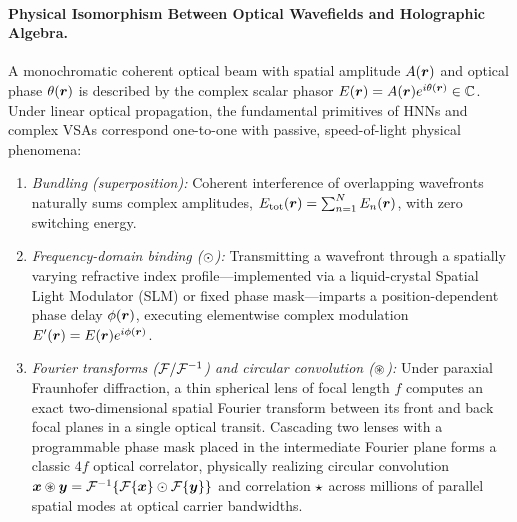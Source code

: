 \paragraph{Physical Isomorphism Between Optical Wavefields and Holographic Algebra.}
A monochromatic coherent optical beam with spatial amplitude $A(\boldsymbol{r})$ and optical phase $\theta(\boldsymbol{r})$ is described by the complex scalar phasor $E(\boldsymbol{r}) = A(\boldsymbol{r}) e^{i\theta(\boldsymbol{r})} \in \mathbb{C}$.
Under linear optical propagation, the fundamental primitives of HNNs and complex VSAs correspond one-to-one with passive, speed-of-light physical phenomena:
\begin{enumerate}
    \item \emph{Bundling (superposition):} Coherent interference of overlapping wavefronts naturally sums complex amplitudes, $E_{\text{tot}}(\boldsymbol{r}) = \sum_{n=1}^{N} E_n(\boldsymbol{r})$, with zero switching energy.
    \item \emph{Frequency-domain binding ($\odot$):} Transmitting a wavefront through a spatially varying refractive index profile---implemented via a liquid-crystal Spatial Light Modulator (SLM) or fixed phase mask---imparts a position-dependent phase delay $\phi(\boldsymbol{r})$, executing elementwise complex modulation $E'(\boldsymbol{r}) = E(\boldsymbol{r}) e^{i\phi(\boldsymbol{r})}$.
    \item \emph{Fourier transforms ($\mathcal{F} / \mathcal{F}^{-1}$) and circular convolution ($\circledast$):} Under paraxial Fraunhofer diffraction, a thin spherical lens of focal length $f$ computes an exact two-dimensional spatial Fourier transform between its front and back focal planes in a single optical transit. Cascading two lenses with a programmable phase mask placed in the intermediate Fourier plane forms a classic $4f$ optical correlator, physically realizing circular convolution $\boldsymbol{x} \circledast \boldsymbol{y} = \mathcal{F}^{-1}\{\mathcal{F}\{\boldsymbol{x}\} \odot \mathcal{F}\{\boldsymbol{y}\}\}$ and correlation $\star$ across millions of parallel spatial modes at optical carrier bandwidths.
\end{enumerate}

